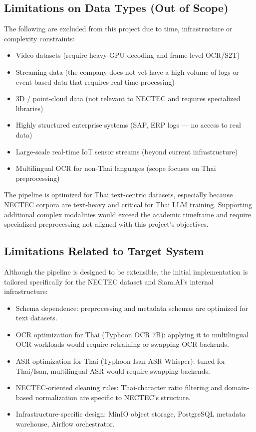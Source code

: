 \documentclass[12pt,oneside,openright,a4paper]{cpe-english-project}
\begin{document}
\subsection{Limitations on Data Types (Out of Scope)}
The following are excluded from this project due to time, infrastructure or complexity constraints:
\begin{itemize}
\item Video datasets (require heavy GPU decoding and frame-level OCR/S2T)
\item Streaming data (the company does not yet have a high volume of logs or event-based data that requires real-time processing)
\item 3D / point-cloud data (not relevant to NECTEC and requires specialized libraries)
\item Highly structured enterprise systems (SAP, ERP logs --- no access to real data)
\item Large-scale real-time IoT sensor streams (beyond current infrastructure)
\item Multilingual OCR for non-Thai languages (scope focuses on Thai preprocessing)
\end{itemize}

The pipeline is optimized for Thai text-centric datasets, especially because NECTEC corpora are text-heavy and critical for Thai LLM training. Supporting additional complex modalities would exceed the academic timeframe and require specialized preprocessing not aligned with this project's objectives.

\subsection{Limitations Related to Target System}
Although the pipeline is designed to be extensible, the initial implementation is tailored specifically for the NECTEC dataset and Siam.AI's internal infrastructure:
\begin{itemize}
\item Schema dependence: preprocessing and metadata schemas are optimized for text datasets.
\item OCR optimization for Thai (Typhoon OCR 7B): applying it to multilingual OCR workloads would require retraining or swapping OCR backends.
\item ASR optimization for Thai (Typhoon Isan ASR Whisper): tuned for Thai/Isan, multilingual ASR would require swapping backends.
\item NECTEC-oriented cleaning rules: Thai-character ratio filtering and domain-based normalization are specific to NECTEC's structure.
\item Infrastructure-specific design: MinIO object storage, PostgreSQL metadata warehouse, Airflow orchestrator.
\end{itemize}
\newpage
\end{document}
